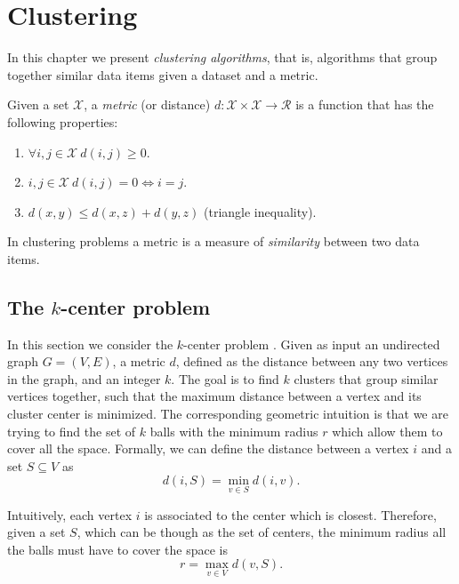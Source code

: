 \chapter{Clustering}

In this chapter we present \emph{clustering algorithms}, that is, algorithms that group together similar data items given a dataset and a metric.

\begin{defn}[Metric]
	Given a set $\mathcal{X}$, a \emph{metric} (or distance) $d:\mathcal{X} \times \mathcal{X} \rightarrow \mathcal{R}$ is a function that has the following properties:
	\begin{enumerate}
		\item $\forall i, j \in \mathcal{X}\ d(i, j) \geq 0$.
		\item $i, j \in \mathcal{X}\ d(i, j) = 0 \Longleftrightarrow i = j$.
		\item $d(x, y) \leq d(x, z) + d(y, z)$ (triangle inequality).
	\end{enumerate} 
\end{defn}

In clustering problems a metric is a measure of \emph{similarity} between two data items.

\section{The $k$-center problem}

In this section we consider the $k$-center problem \cite{desappralgo}. Given as input an undirected graph $G=(V, E)$, a metric $d$, defined as the distance between any two vertices in the graph, and an integer $k$. The goal is to find $k$ clusters that group similar vertices together, such that the maximum distance between a vertex and its cluster center is minimized. The corresponding geometric intuition is that we are trying to find the set of $k$ balls with the minimum radius $r$ which allow them to cover all the space. Formally, we can define the distance between a vertex $i$ and a set $S \subseteq V$ as
\begin{equation}
	d(i, S) = \min_{v \in S} d(i, v).
\end{equation}

Intuitively, each vertex $i$ is associated to the center which is closest. Therefore, given a set $S$, which can be though as the set of centers, the minimum radius all the balls must have to cover the space is
\begin{equation}
	r = \max_{v \in V} d(v, S).
\end{equation}

